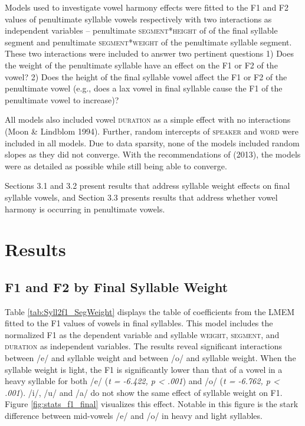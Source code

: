 \documentclass[12pt]{ouparticle}
\begin{document}
Models used to investigate vowel harmony effects were fitted to the F1 and F2 values of penultimate syllable vowels respectively with two interactions as independent variables -- penultimate \textsc{segment}*\textsc{height} of of the final syllable segment and penultimate \textsc{segment}*\textsc{weight} of the penultimate syllable segment. These two interactions were included to answer two pertinent questions 1) Does the weight of the penultimate syllable have an effect on the F1 or F2 of the vowel? 2) Does the height of the final syllable vowel affect the F1 or F2 of the penultimate vowel (e.g., does a lax vowel in final syllable cause the F1 of the penultimate vowel to increase)? 

All models also included vowel \textsc{duration} as a simple effect with no interactions (Moon \& Lindblom 1994). Further, random intercepts of \textsc{speaker} and \textsc{word} were included in all models. Due to data sparsity, none of the models included random slopes as they did not converge. With the recommendations of \citeauthor{barr2013} (2013), the models were as detailed as possible while still being able to converge.

Sections 3.1 and 3.2 present results that address syllable weight effects on final syllable vowels, and Section 3.3 presents results that address whether vowel harmony is occurring in penultimate vowels.


\section{Results}\label{sec:results}

\subsection{F1 and F2 by Final Syllable Weight}\label{sec:Syll1f1_SegWeight}

Table \ref{tab:Syll2f1_SegWeight} displays the table of coefficients from the LMEM fitted to the F1 values of vowels in final syllables. This model includes the normalized F1 as the dependent variable and syllable \textsc{weight}, \textsc{segment}, and \textsc{duration} as independent variables. The results reveal significant interactions between /e/ and syllable weight and between /o/ and syllable weight. When the syllable weight is light, the F1 is significantly lower than that of a vowel in a heavy syllable for both /e/ (\textit{t = -6.422, p < .001}) and /o/ (\textit{t = -6.762, p < .001}). /i/, /u/ and /a/ do not show the same effect of syllable weight on F1. Figure \ref{fig:stats_f1_final} visualizes this effect. Notable in this figure is the stark difference between mid-vowels /e/ and /o/ in heavy and light syllables.
\end{document}

